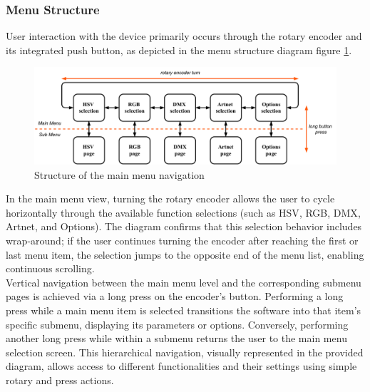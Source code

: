 \subsubsection{Menu Structure}
User interaction with the device primarily occurs through the rotary encoder and its integrated push button, as depicted in the menu structure diagram figure \ref{fig:menustructure}.
\begin{figure}[H]
	\centering
	\includegraphics[width=0.95\linewidth]{graphics/menu_structure}
	\caption{Structure of the main menu navigation}
	\label{fig:menustructure}
\end{figure}

In the main menu view, turning the rotary encoder allows the user to cycle horizontally through the available function selections (such as \acs{HSV}, \ac{RGB}, \ac{DMX}, Artnet, and Options). The diagram confirms that this selection behavior includes wrap-around; if the user continues turning the encoder after reaching the first or last menu item, the selection jumps to the opposite end of the menu list, enabling continuous scrolling.\\

Vertical navigation between the main menu level and the corresponding submenu pages is achieved via a long press on the encoder's button. Performing a long press while a main menu item is selected transitions the software into that item's specific submenu, displaying its parameters or options. Conversely, performing another long press while within a submenu returns the user to the main menu selection screen. This hierarchical navigation, visually represented in the provided diagram, allows access to different functionalities and their settings using simple rotary and press actions.